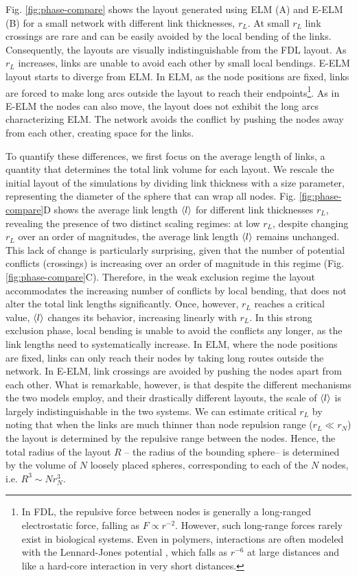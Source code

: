 \documentclass[nofootinbib,preprint,floatfix,titlepage,endfloats]{revtex4} %
\begin{document}
Fig. \ref{fig:phase-compare} shows the layout generated using ELM (A) and E-ELM (B) for a small %
network %
with different link thicknesses, $r_L$. At small $r_L$ link crossings are rare and can be easily avoided by the local bending of the links. Consequently, 
the layouts are visually indistinguishable from the FDL layout. As $r_L$ increases, links are unable to avoid each other by small local bendings. E-ELM layout starts to diverge from ELM. In ELM, as the node positions are fixed, links are forced to make long arcs outside the layout to reach their endpoints\footnote{In FDL, the repulsive force between nodes is generally a long-ranged electrostatic force, falling as $F \propto r^{-2}$. 
However, such long-range forces rarely exist in biological systems. Even in polymers, interactions are often modeled with the Lennard-Jones potential \cite{lennard1924determination}, which falls as $r^{-6}$ at large distances and like a hard-core interaction in very short distances.}.
As in E-ELM the nodes can also move, the layout does not exhibit the long arcs characterizing ELM. The network avoids the conflict by pushing the nodes away from each other, creating space for the links. 

To quantify these differences, we first focus on the average length of links, a quantity that determines the total link volume for each layout. We rescale the initial layout of the simulations by dividing link thickness with a size parameter, representing the diameter of the sphere that can wrap all nodes. Fig. \ref{fig:phase-compare}D shows the average link length $\left<l\right>$ for different link thicknesses $r_L$, revealing the presence of two distinct scaling regimes: at low $r_L$, despite changing $r_L$ over an order of magnitudes, the average link length $\left<l\right>$ remains unchanged. 
This lack of change is particularly surprising, given that the number of potential conflicts (crossings) is increasing over an order of magnitude in this regime (Fig. \ref{fig:phase-compare}C). Therefore, in the weak exclusion regime the layout accommodates the increasing number of conflicts by local bending, that does not alter the total link lengths significantly. 
Once, however, $r_L$ reaches a critical value, $\left<l\right>$ changes its behavior, increasing linearly with $r_L$. 
In this strong exclusion phase, local bending is unable to avoid the conflicts any longer, as the link lengths need to systematically increase. In ELM, where the node positions are fixed, links can only reach their nodes by taking long routes outside the network. In E-ELM, link crossings are avoided by pushing the nodes apart from each other. What is remarkable, however, is that despite the different mechanisms the two models employ, and their drastically different layouts, the scale of $\left<l\right>$ is largely indistinguishable in the two systems.
We can estimate critical $r_L$ by noting that when the links are much thinner than node repulsion range ($r_L\ll r_N$) the layout is determined by the repulsive range between the nodes. Hence, the total radius of the layout $R$ -- the radius of the bounding sphere-- is determined by the volume of $N$ loosely placed spheres, corresponding to each of the  $N$ nodes, i.e. $ R^3 \sim Nr_N^3 $. 
\end{document}
